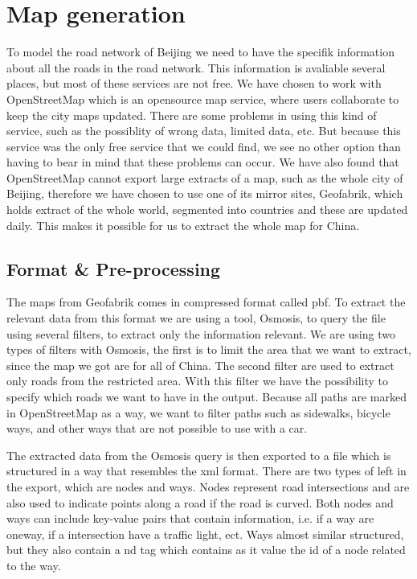 \section{Map generation}
To model the road network of Beijing we need to have the specifik information about all the roads in the road network. This information is avaliable several places, but most of these services are not free. We have chosen to work with OpenStreetMap which is an opensource map service, where users collaborate to keep the city maps updated. There are some problems in using this kind of service, such as the possiblity of wrong data, limited data, etc. But because this service was the only free service that we could find, we see no other option than having to bear in mind that these problems can occur. We have also found that OpenStreetMap cannot export large extracts of a map, such as the whole city of Beijing, therefore we have chosen to use one of its mirror sites, Geofabrik, which holds extract of the whole world, segmented into countries and these are updated daily. This makes it possible for us to extract the whole map for China.

\subsection{Format \& Pre-processing}
The maps from Geofabrik comes in compressed format called pbf. To extract the relevant data from this format we are using a tool, Osmosis, to query the file using several filters, to extract only the information relevant.
We are using two types of filters with Osmosis, the first is to limit the area that we want to extract, since the map we got are for all of China. The second filter are used to extract only roads from the restricted area.
With this filter we have the possibility to specify which roads we want to have in the output. Because all paths are marked in OpenStreetMap as a way, we want to filter paths such as sidewalks, bicycle ways, and other ways that are not possible to use with a car.

The extracted data from the Osmosis query is then exported to a file which is structured in a way that resembles the xml format. There are two types of left in the export, which are nodes and ways. Nodes represent road intersections and are also used to indicate points along a road if the road is curved. Both nodes and ways can include key-value pairs that contain information, i.e. if a way are oneway, if a intersection have a traffic light, ect.
Ways almost similar structured, but they also contain a nd tag which contains as it value the id of a node related to the way.

